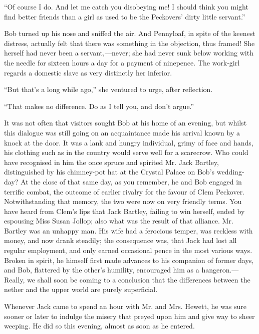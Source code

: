 {\protect\hypertarget{225}{}{}}``Of course I do. And let me catch you
disobeying me! I should think you might find better friends than a girl
as used to be the Peckovers' dirty little servant.''

Bob turned up his nose and sniffed the air. And Pennyloaf, in spite of
the keenest distress, actually felt that there was something in the
objection, thus framed! She herself had never been a servant,---never;
she had never sunk below working with the needle for sixteen hours a day
for a payment of ninepence. The work-girl regards a domestic slave as
very distinctly her inferior.

``But that's a long while ago,'' she ventured to urge, after reflection.

``That makes no difference. Do as I tell you, and don't argue.''

It was not often that visitors sought Bob at his home of an evening, but
whilst this dialogue was still going on an acquaintance made his arrival
known by a knock at the door. It was a lank and hungry individual, grimy
of face and hands, his clothing such as in the country would serve well
for a {\protect\hypertarget{226}{}{}}scarecrow. Who could have
recognised in him the once spruce and spirited Mr. Jack Bartley,
distinguished by his chimney-pot hat at the Crystal Palace on Bob's
wedding-day? At the close of that same day, as you remember, he and Bob
engaged in terrific combat, the outcome of earlier rivalry for the
favour of Clem Peckover. Notwithstanding that memory, the two were now
on very friendly terms. You have heard from Clem's lips that Jack
Bartley, failing to win herself, ended by espousing Miss Susan Jollop;
also what was the result of that alliance. Mr. Bartley was an unhappy
man. His wife had a ferocious temper, was reckless with money, and now
drank steadily; the consequence was, that Jack had lost all regular
employment, and only earned occasional pence in the most various ways.
Broken in spirit, he himself first made advances to his companion of
former days, and Bob, flattered by the other's humility, encouraged him
as a hangeron.---Really, we shall soon be coming to a conclusion that
the differences between the {\protect\hypertarget{227}{}{}}nether and
the upper world are purely superficial.

Whenever Jack came to spend an hour with Mr. and Mrs. Hewett, he was
sure sooner or later to indulge the misery that preyed upon him and give
way to sheer weeping. He did so this evening, almost as soon as he
entered.

